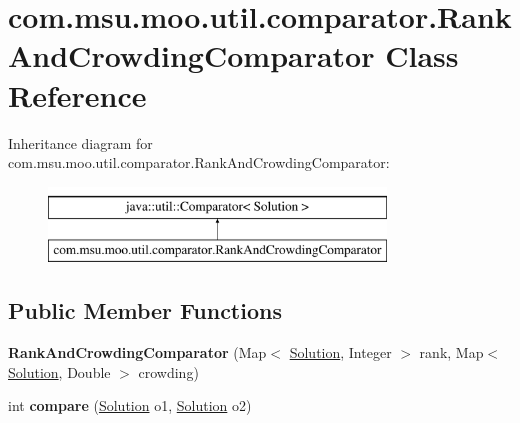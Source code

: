\hypertarget{classcom_1_1msu_1_1moo_1_1util_1_1comparator_1_1RankAndCrowdingComparator}{\section{com.\-msu.\-moo.\-util.\-comparator.\-Rank\-And\-Crowding\-Comparator Class Reference}
\label{classcom_1_1msu_1_1moo_1_1util_1_1comparator_1_1RankAndCrowdingComparator}
}
Inheritance diagram for com.\-msu.\-moo.\-util.\-comparator.\-Rank\-And\-Crowding\-Comparator\-:\begin{figure}[H]
\begin{center}
\leavevmode
\includegraphics[height=2.000000cm]{classcom_1_1msu_1_1moo_1_1util_1_1comparator_1_1RankAndCrowdingComparator}
\end{center}
\end{figure}
\subsection*{Public Member Functions}
\begin{DoxyCompactItemize}
\item 
\hypertarget{classcom_1_1msu_1_1moo_1_1util_1_1comparator_1_1RankAndCrowdingComparator_a6f5153980f8ef6b4351ac043a13e42ff}{{\bfseries Rank\-And\-Crowding\-Comparator} (Map$<$ \hyperlink{classcom_1_1msu_1_1moo_1_1model_1_1solution_1_1Solution}{Solution}, Integer $>$ rank, Map$<$ \hyperlink{classcom_1_1msu_1_1moo_1_1model_1_1solution_1_1Solution}{Solution}, Double $>$ crowding)}\label{classcom_1_1msu_1_1moo_1_1util_1_1comparator_1_1RankAndCrowdingComparator_a6f5153980f8ef6b4351ac043a13e42ff}

\item 
\hypertarget{classcom_1_1msu_1_1moo_1_1util_1_1comparator_1_1RankAndCrowdingComparator_a78325edd99ed2af6ed2174413d36e162}{int {\bfseries compare} (\hyperlink{classcom_1_1msu_1_1moo_1_1model_1_1solution_1_1Solution}{Solution} o1, \hyperlink{classcom_1_1msu_1_1moo_1_1model_1_1solution_1_1Solution}{Solution} o2)}\label{classcom_1_1msu_1_1moo_1_1util_1_1comparator_1_1RankAndCrowdingComparator_a78325edd99ed2af6ed2174413d36e162}

\end{DoxyCompactItemize}
